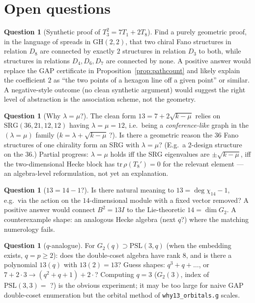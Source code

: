\documentclass[11pt]{article}
\theoremstyle{definition}
\newtheorem{question}[theorem]{Question}
\newcommand{\GH}{\mathrm{GH}}
\newcommand{\PSL}{\mathrm{PSL}}
\begin{document}
\section{Open questions}\label{sec:open}

\begin{question}[Synthetic proof of $T_3^2 = 7T_1 + 2T_8$]
Find a purely geometric proof, in the language of spreads in $\GH(2,2)$,
that two chiral Fano structures in relation $D_8$ are connected by exactly
$2$ structures in relation $D_3$ to both, while structures in relations
$D_4, D_6, D_7$ are connected by none. A positive answer would replace the
GAP certificate in Proposition~\ref{prop:pathcount} and likely explain the
coefficient $2$ as ``the two points of a hexagon line off a given point''
or similar. A negative-style outcome (no clean synthetic argument) would
suggest the right level of abstraction is the association scheme, not the
geometry.
\end{question}

\begin{question}[Why $\lambda = \mu$?]
The clean form $13 = 7 + 2\sqrt{k-\mu}$ relies on
$\mathrm{SRG}(36,21,12,12)$ having $\lambda = \mu = 12$, i.e.\ being a
\emph{conference-like} graph in the $(\lambda{=}\mu)$ family
($k = \lambda + \sqrt{k-\mu}\,$?). Is there a geometric reason the
$36$ Fano structures of one chirality form an SRG with $\lambda = \mu$?
(E.g.\ a $2$-design structure on the $36$.) Partial progress: $\lambda =
\mu$ holds iff the SRG eigenvalues are $\pm\sqrt{k-\mu}$, iff the
two-dimensional Hecke block has $\mathrm{tr}\,\rho(T_8') = 0$ for the
relevant element --- an algebra-level reformulation, not yet an
explanation.
\end{question}

\begin{question}[$13 = 14 - 1$?]
Is there natural meaning to $13 = \deg\chi_{14} - 1$, e.g.\ via the action
on the $14$-dimensional module with a fixed vector removed? A positive
answer would connect $B^2 = 13I$ to the Lie-theoretic $14 = \dim G_2$. A
counterexample shape: an analogous Hecke algebra (next $q$?) where the
matching numerology fails.
\end{question}

\begin{question}[$q$-analogue]
For $G_2(q) \supset \PSL(3,q)$ (when the embedding exists, $q = p \geq 2$):
does the double-coset algebra have rank $8$, and is there a polynomial
$13(q)$ with $13(2) = 13$? Guess shapes: $q^3 + q + \ldots$, or
$7 + 2\cdot 3 \to (q^2{+}q{+}1) + 2\cdot$? Computing $q = 3$
($G_2(3)$, index of $\PSL(3,3) = $ ?) is the obvious experiment; it may be
too large for naive GAP double-coset enumeration but the orbital method of
\texttt{why13\_orbitals.g} scales.
\end{question}
\end{document}

